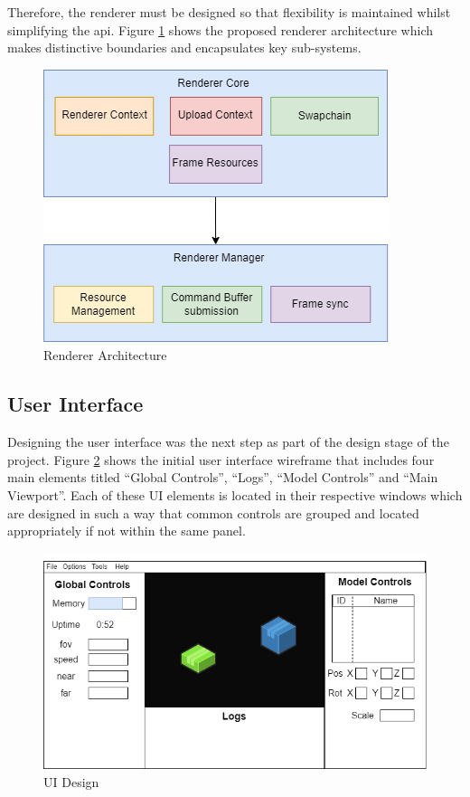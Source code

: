 \documentclass[11pt]{article}
\begin{document}
Therefore, the renderer must be designed so that flexibility is maintained
whilst simplifying the \gls{api}. Figure \ref{fig:rendererarch} shows the
proposed renderer architecture which makes distinctive boundaries and
encapsulates key sub-systems.

\begin{figure}[H]
  \centering
  \includegraphics[width=\textwidth]{images/renderer_architecture.png}
  \caption{Renderer Architecture}
  \label{fig:rendererarch}
\end{figure}

\subsection{User Interface}
Designing the user interface was the next step as part of the design stage of
the project. Figure \ref{fig:ui_design} shows the initial user interface
wireframe that includes four main elements titled ``Global Controls'', ``Logs'',
``Model Controls'' and ``Main Viewport''. Each of these UI elements is located
in their respective windows which are designed in such a way that common
controls are grouped and located appropriately if not within the same panel.

\begin{figure}[H]
  \centering
  \includegraphics[width=\textwidth]{images/ui_design.png}
  \caption{UI Design}
  \label{fig:ui_design}
\end{figure}
\end{document}

